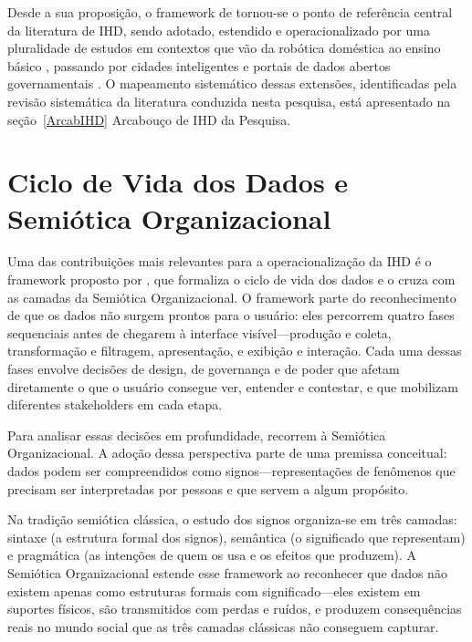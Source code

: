 \documentclass[
	12pt,				%
	oneside,			%
	a4paper,			%
	english,			%
	brazil				%
	]{abntex2ppgsi}
\begin{document}
    Desde a sua proposição, o framework de  tornou-se o ponto de referência central da literatura de IHD, sendo adotado, estendido e operacionalizado por uma pluralidade de estudos em contextos que vão da robótica doméstica \cite{Chatzimichali2021160} ao ensino básico \cite{Lockwood2021}, passando por cidades inteligentes \cite{Mashhadi2014} e portais de dados abertos governamentais \cite{VICTORELLI2020Understanding, JoseViterbo2020}. O mapeamento sistemático dessas extensões, identificadas pela revisão sistemática da literatura conduzida nesta pesquisa, está apresentado na seção~\ref{ArcabIHD} Arcabouço de IHD da Pesquisa.

    \section{Ciclo de Vida dos Dados e Semiótica Organizacional}

    Uma das contribuições mais relevantes para a operacionalização da IHD é o framework proposto por , que formaliza o ciclo de vida dos dados e o cruza com as camadas da Semiótica Organizacional. O framework parte do reconhecimento de que os dados não surgem prontos para o usuário: eles percorrem quatro fases sequenciais antes de chegarem à interface visível---produção e coleta, transformação e filtragem, apresentação, e exibição e interação. Cada uma dessas fases envolve decisões de design, de governança e de poder que afetam diretamente o que o usuário consegue ver, entender e contestar, e que mobilizam diferentes stakeholders em cada etapa.

    Para analisar essas decisões em profundidade,  recorrem à Semiótica Organizacional. A adoção dessa perspectiva parte de uma premissa conceitual: dados podem ser compreendidos como signos---representações de fenômenos que precisam ser interpretadas por pessoas e que servem a algum propósito.

    Na tradição semiótica clássica, o estudo dos signos organiza-se em três camadas: sintaxe (a estrutura formal dos signos), semântica (o significado que representam) e pragmática (as intenções de quem os usa e os efeitos que produzem). A Semiótica Organizacional estende esse framework ao reconhecer que dados não existem apenas como estruturas formais com significado---eles existem em suportes físicos, são transmitidos com perdas e ruídos, e produzem consequências reais no mundo social que as três camadas clássicas não conseguem capturar.
\end{document}
